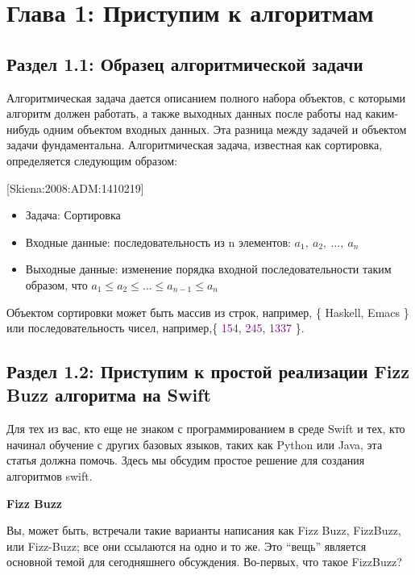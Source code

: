 
\chapter*{Глава 1: Приступим к алгоритмам}
\section*{Раздел 1.1: Образец алгоритмической задачи}

Алгоритмическая задача дается описанием полного набора объектов, с которыми алгоритм должен работать, а также выходных данных после работы над каким-нибудь одним объектом входных данных. Эта разница между задачей и объектом задачи фундаментальна. Алгоритмическая задача, известная как сортировка, определяется следующим образом: 

[Skiena:2008:ADM:1410219]
\begin{itemize}
\item Задача: Сортировка
\item Входные данные: последовательность из n элементов: $a_1,\ a_2,\ \dots,\ a_n$
\item Выходные данные: изменение порядка входной последовательности таким образом, что $a_1 \leqslant a_2 \leqslant \dots \leqslant a_{n-1} \leqslant a_n$
\end{itemize}

Объектом сортировки может быть массив из строк, например, \{ Haskell, Emacs \} или последовательность чисел, например,\{ \textcolor{Purple}{154}, \textcolor{Purple}{245}, \textcolor{Purple}{1337} \}. 

\section*{Раздел 1.2: Приступим к простой реализации Fizz Buzz алгоритма на Swift}

Для тех из вас, кто еще не знаком с программированием в среде Swift и тех, кто начинал обучение с других базовых языков, таких как Python или Java, эта статья должна помочь. Здесь мы обсудим простое решение для создания алгоритмов swift.

\vspace{\baselineskip}

\textbf{Fizz Buzz}

\vspace{\baselineskip}

Вы, может быть, встречали такие варианты написания как Fizz Buzz, FizzBuzz, или Fizz-Buzz; все они ссылаются на одно и то же. Это “вещь” является основной темой для сегодняшнего обсуждения. Во-первых, что такое FizzBuzz?

